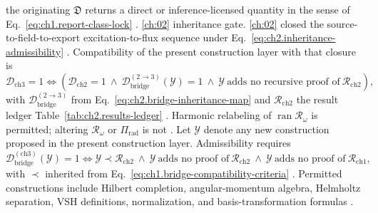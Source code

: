 the originating \(\mathfrak{D}\) returns a direct or inference-licensed quantity in the sense of
Eq.~\eqref{eq:ch1.report-class-lock} \cite{stratton1941}.
\ref{ch:02} inheritance gate. \ref{ch:02} closed the source-to-field-to-export excitation-to-flux sequence under
Eq.~\eqref{eq:ch2.inheritance-admissibility} \cite{stratton1941}. Compatibility of
the present construction layer with that closure is
\begin{equation}
\label{eq:ch3.ch2-inheritance-gate}
\mathcal{D}_{\mathrm{ch3}}=1
\iff
\left(
\mathcal{D}_{\mathrm{ch2}}=1\
\wedge\
\mathcal{D}_{\mathrm{bridge}}^{(2\to 3)}(\mathcal{Y})=1\
\wedge\
\mathcal{Y}\ \text{adds no recursive proof of}\ \mathcal{R}_{\mathrm{ch2}}
\right),
\end{equation}
with \(\mathcal{D}_{\mathrm{bridge}}^{(2\to 3)}\) from Eq.~\eqref{eq:ch2.bridge-inheritance-map}
and \(\mathcal{R}_{\mathrm{ch2}}\) the result ledger Table~\ref{tab:ch2.results-ledger}
\cite{stratton1941}. Harmonic relabeling of \(\operatorname{ran}\mathcal{R}_\omega\) is
permitted; altering \(\mathcal{R}_\omega\) or \(\Pi_{\mathrm{rad}}\) is not \cite{stratton1941}.
Let \(\mathcal{Y}\) denote any new construction proposed in the present construction layer. Admissibility
requires
\begin{equation}
\label{eq:ch3.bridge-nonrecursion}
\mathcal{D}_{\mathrm{bridge}}^{(\mathrm{ch3})}(\mathcal{Y})=1
\iff
\mathcal{Y}\prec\mathcal{R}_{\mathrm{ch2}}
\ \wedge\
\mathcal{Y}\ \text{adds no proof of}\ \mathcal{R}_{\mathrm{ch2}}
\ \wedge\
\mathcal{Y}\ \text{adds no proof of}\ \mathcal{R}_{\mathrm{ch1}},
\end{equation}
with \(\prec\) inherited from Eq.~\eqref{eq:ch1.bridge-compatibility-criteria}
\cite{stratton1941}. Permitted constructions include Hilbert completion, angular-momentum algebra,
Helmholtz separation, VSH definitions, normalization, and basis-transformation formulas
\cite{hansen1988}.

